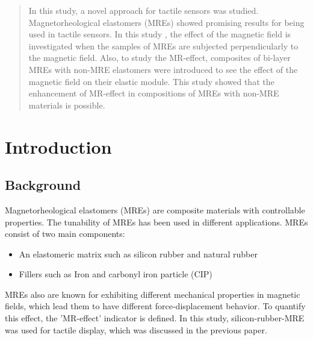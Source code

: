 \documentclass[conference]{IEEEtran}
\begin{document}
\begin{abstract}
	In this study, a novel approach for tactile sensors was studied. Magnetorheological elastomers (MREs) showed promising results for being used in tactile sensors. In this study \cite{b1}, the effect of the magnetic field is investigated when the samples of MREs are subjected perpendicularly to the magnetic field. Also, to study the MR-effect, composites of bi-layer MREs with non-MRE elastomers were introduced to see the effect of the magnetic field on their elastic module. This study showed that the enhancement of MR-effect in compositions of MREs with non-MRE materials is possible.
\end{abstract}


\section{Introduction}

\subsection{Background}
Magnetorheological elastomers (MREs) are composite materials with controllable properties. The tunability of MREs has been used in different applications. MREs consist of two main components:
\begin{itemize}
	\item An elastomeric matrix such as silicon rubber and natural rubber 
	\item Fillers such as Iron and carbonyl iron particle (CIP)
\end{itemize}
MREs also are known for exhibiting different mechanical properties in magnetic fields, which lead them to have different force-displacement behavior. To quantify this effect, the 'MR-effect' indicator is defined. In this study, silicon-rubber-MRE was used for tactile display, which was discussed in the previous paper. 
\end{document}
